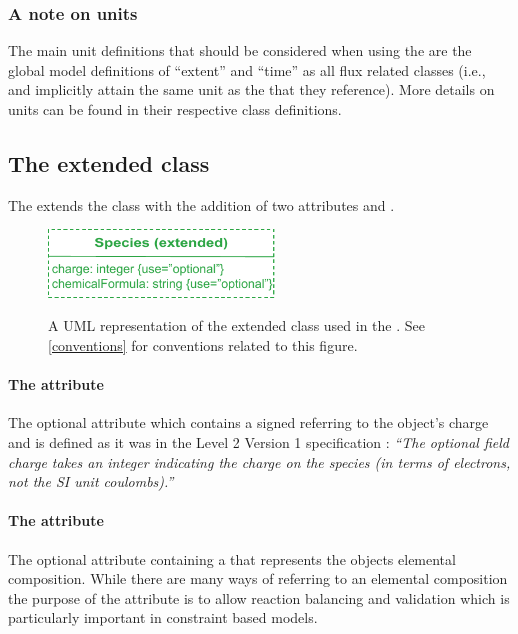\subsubsection{A note on units}
\label{fbcunits}
The main unit definitions that should be considered when using the \FBCPackage are the global model definitions of ``extent''  and ``time'' as all \FBC flux related classes (i.e., \FluxBound and \FluxObjective implicitly attain the same unit as the \Reaction that they reference). More details on units can be found in their respective class definitions.

\subsection{The extended  class}
\label{species-class}

The \FBCPackage extends the \sbmlthreecore \Species class with the addition
of two attributes  and .
%
\begin{figure}[h]
  \centering
  \includegraphics[width=6cm]{images/fbc_uml_species.pdf}\\
  \caption{A UML representation of the extended \SBML \Species class used in
  the \FBCPackage. See \ref{conventions} for conventions related to this
  figure.}
  \label{fig:fbc_uml_species}
\end{figure}


\paragraph{The  attribute}
The optional attribute  which contains a signed
 referring to the \Species object's charge and is
defined as it was in the \SBML Level 2 Version 1 specification
: \textit{``The optional field charge takes an integer indicating
the charge on the species (in terms of electrons, not the SI unit coulombs).''}

\paragraph{The  attribute}
\label{chemicalFormula-attribute}
The optional attribute  containing a
 that represents the \Species objects elemental
composition.
%
%
While there are many ways of referring to an elemental composition the purpose of the  attribute is to allow reaction balancing and validation which is particularly important in constraint based models.

